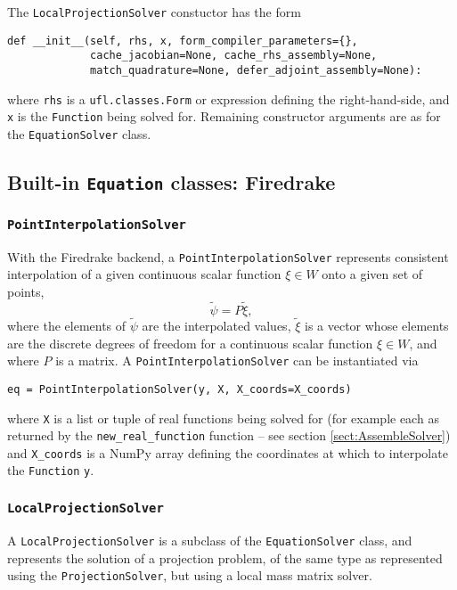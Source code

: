 \documentclass[11pt]{article}
\begin{document}
The \texttt{LocalProjectionSolver} constuctor has the form
\begin{lstlisting}
def __init__(self, rhs, x, form_compiler_parameters={},
             cache_jacobian=None, cache_rhs_assembly=None,
             match_quadrature=None, defer_adjoint_assembly=None):
\end{lstlisting}
where \texttt{rhs} is a \texttt{ufl.classes.Form} or expression defining the
right-hand-side, and \texttt{x} is the \texttt{Function} being solved for.
Remaining constructor arguments are as for the \texttt{EquationSolver} class.

\subsection{Built-in \texttt{Equation} classes: Firedrake}

\subsubsection{\texttt{PointInterpolationSolver}}

With the Firedrake backend, a \texttt{PointInterpolationSolver} represents
consistent interpolation of a given continuous scalar function $\xi \in W$ onto
a given set of points,
\begin{equation*}
  \tilde{\psi} = P \tilde{\xi},
\end{equation*}
where the elements of $\tilde{\psi}$ are the interpolated values, $\tilde{\xi}$
is a vector whose elements are the discrete degrees of freedom for a continuous
scalar function $\xi \in W$, and where $P$ is a matrix. A
\texttt{PointInterpolationSolver} can be instantiated via
\begin{lstlisting}
eq = PointInterpolationSolver(y, X, X_coords=X_coords)
\end{lstlisting}
where \texttt{X} is a list or tuple of real functions being solved for (for
example each as returned by the \texttt{new\_real\_function} function -- see
section \ref{sect:AssembleSolver}) and \texttt{X\_coords} is a NumPy array
defining the coordinates at which to interpolate the \texttt{Function}
\texttt{y}.

\subsubsection{\texttt{LocalProjectionSolver}}

A \texttt{LocalProjectionSolver} is a subclass of the \texttt{EquationSolver}
class, and represents the solution of a projection problem, of the same type as
represented using the \texttt{ProjectionSolver}, but using a local mass matrix
solver.
\end{document}
